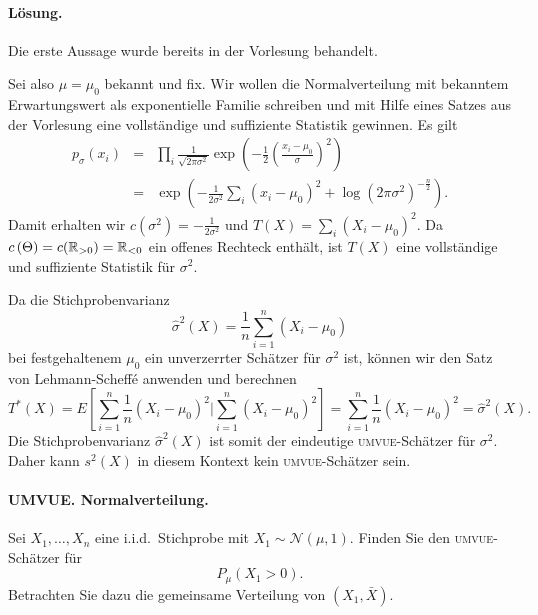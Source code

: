 \paragraph*{Lösung.} 
Die erste Aussage wurde bereits in der Vorlesung behandelt. 

Sei also $\mu=\mu_0$ bekannt und fix.  Wir wollen die Normalverteilung mit
bekanntem Erwartungswert als exponentielle Familie schreiben und mit Hilfe
eines Satzes aus der Vorlesung eine vollständige und suffiziente Statistik
gewinnen. Es gilt
\begin{eqnarray}
	p_\sigma(x_i) &=& \prod_i \frac{1}{\sqrt{2 \pi \sigma^2}} 
	\exp\left( -\frac{1}{2} \left( \frac{x_i - \mu_0}{\sigma}\right)^2 \right) \\
	&=& \exp\left( -\frac{1}{2 \sigma^2} \sum_{i}^{} \left( x_i - \mu_0 \right)^2 +
		\log\left( 2 \pi \sigma^2 \right)^{-\frac{n}{2}}  \right).
\end{eqnarray}
Damit erhalten wir $c(\sigma^2) = -\frac{1}{2 \sigma^2}$ und $T(X) = \sum_{i}^{} \left( X_i - \mu_0 \right)^2$.
Da $c\left( \Theta \right) = c(\mathbb R_{>0})= \mathbb R_{<0}$ ein offenes Rechteck enthält, ist $T\left( X \right)$
eine vollständige und suffiziente Statistik für $\sigma^2$.

Da die Stichprobenvarianz
\begin{equation}
	\hat\sigma^2(X) = \frac{1}{n} \sum_{i=1}^{n} (X_i - \mu_0)
\end{equation}
bei festgehaltenem $\mu_0$ ein unverzerrter Schätzer für $\sigma^2$ ist, können 
wir den Satz von Lehmann-Scheff\'e anwenden und berechnen 
\begin{equation}
	T^*\left( X \right) = E\left[ \sum_{i=1}^{n} \frac{1}{n} \left( X_i-\mu_0 \right)^2 | \sum_{i=1}^{n} \left( X_i-\mu_0 \right)^2 \right] = \sum_{i=1}^{n} \frac{1}{n} \left( X_i-\mu_0 \right)^2 = \hat\sigma^2(X).
\end{equation}
Die Stichprobenvarianz $\hat\sigma^2(X)$ ist somit der eindeutige \textsc{umvue}-Schätzer
für $\sigma^2$. Daher kann $s^2(X)$ in diesem Kontext kein
\textsc{umvue}-Schätzer sein.







\paragraph{UMVUE. Normalverteilung. } Sei $X_1,\ldots,X_n$ eine i.i.d.\
Stichprobe mit $X_1\sim\mathcal N(\mu,1)$. Finden Sie den 
\textsc{umvue}-Schätzer für
\begin{equation*}
	P_\mu (X_1>0).
\end{equation*}
Betrachten Sie dazu die gemeinsame Verteilung von $(X_1,\bar X)$.

